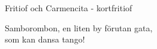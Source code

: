 \begin{song}{Fritiof och Carmencita - kort}{fritiof}
\begin{vers}
Samborombon, en liten by förutan gata,\\
som kan dansa tango!\\
\end{vers}
\end{song}
